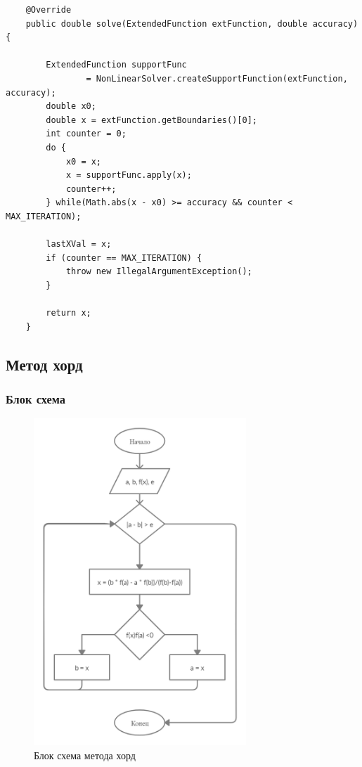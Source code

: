 \documentclass[11pt, english]{article}
\begin{document}
\begin{center}
    \begin{lstlisting}
    @Override
    public double solve(ExtendedFunction extFunction, double accuracy) {

        ExtendedFunction supportFunc 
                = NonLinearSolver.createSupportFunction(extFunction, accuracy);
        double x0;
        double x = extFunction.getBoundaries()[0];
        int counter = 0;
        do {
            x0 = x;
            x = supportFunc.apply(x);
            counter++;
        } while(Math.abs(x - x0) >= accuracy && counter < MAX_ITERATION);

        lastXVal = x;
        if (counter == MAX_ITERATION) {
            throw new IllegalArgumentException();
        }

        return x;
    }
    \end{lstlisting}
\end{center}
\newpage
\subsection{Метод хорд}
\subsubsection{Блок схема}
\begin{figure}[!h]
    \centering
    \includegraphics[width=8cm]{secant-schema.jpg}
    \caption{Блок схема метода хорд}
    \label{fig:my_label}
\end{figure}
\newpage
\end{document}
